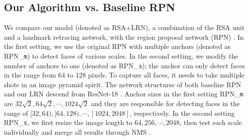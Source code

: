 \documentclass[10pt,twocolumn,letterpaper]{article}
\begin{document}



\subsection{Our Algorithm vs. Baseline RPN}\label{sec:vsbase}

We compare our model (denoted as RSA+LRN), a combination of the RSA unit and a landmark retracing network,  with the 
region proposal network (RPN) \cite{faster_rcnn}.
%
In the first setting, we use the original RPN with multiple anchors (denoted as RPN\_\texttt{m}) to detect faces of various scales. 
%
In the second setting, we modify the number of anchors to one (denoted as RPN\_\texttt{s}); the anchor can only detect faces in the range from 64 to 128 pixels. 
%
To capture all faces, it needs to take multiple shots in an image pyramid spirit. 
%
The network structurse of both baseline RPN and our LRN descend from ResNet-18 \cite{resNet}.
%
Anchor sizes in the first setting RPN\_\texttt{m} are
$32\sqrt{2}, 64\sqrt{2}, \cdots, 1024\sqrt{2}$ %
and they are responsible for detecting faces in the range of $[32,64), [64,128), \cdots, [1024,2048]$, respectively.
%
%
In the second setting
RPN\_\texttt{s}, 
we first resize the image length to $64, 256, \cdots, 2048$, then test each scale individually and merge all results through NMS \cite{pami_nms}.
\end{document}
